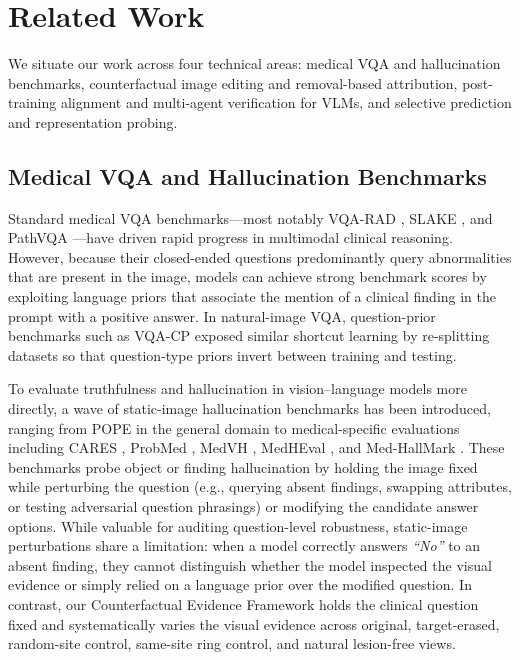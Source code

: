 \documentclass{article} %
\begin{document}
\section{Related Work}
\label{sec:related_work}
We situate our work across four technical areas: medical VQA and hallucination benchmarks, counterfactual image editing and removal-based attribution, post-training alignment and multi-agent verification for VLMs, and selective prediction and representation probing.

\subsection{Medical VQA and Hallucination Benchmarks}
\label{subsec:rw_benchmarks}
Standard medical VQA benchmarks---most notably VQA-RAD \citep{lau2018vqarad}, SLAKE \citep{liu2021slake}, and PathVQA \citep{he2020pathvqa}---have driven rapid progress in multimodal clinical reasoning. However, because their closed-ended questions predominantly query abnormalities that are present in the image, models can achieve strong benchmark scores by exploiting language priors that associate the mention of a clinical finding in the prompt with a positive answer. In natural-image VQA, question-prior benchmarks such as VQA-CP \citep{agrawal2018vqacp} exposed similar shortcut learning by re-splitting datasets so that question-type priors invert between training and testing.

To evaluate truthfulness and hallucination in vision--language models more directly, a wave of static-image hallucination benchmarks has been introduced, ranging from POPE \citep{li2023pope} in the general domain to medical-specific evaluations including CARES \citep{xia2024cares}, ProbMed \citep{yan2024probmed}, MedVH \citep{gu2024medvh}, MedHEval \citep{chang2024medheval}, and Med-HallMark \citep{chen2024medhallmark}. These benchmarks probe object or finding hallucination by holding the image fixed while perturbing the question (e.g., querying absent findings, swapping attributes, or testing adversarial question phrasings) or modifying the candidate answer options. While valuable for auditing question-level robustness, static-image perturbations share a limitation: when a model correctly answers \emph{``No''} to an absent finding, they cannot distinguish whether the model inspected the visual evidence or simply relied on a language prior over the modified question. In contrast, our Counterfactual Evidence Framework holds the clinical question fixed and systematically varies the visual evidence across original, target-erased, random-site control, same-site ring control, and natural lesion-free views.
\end{document}
